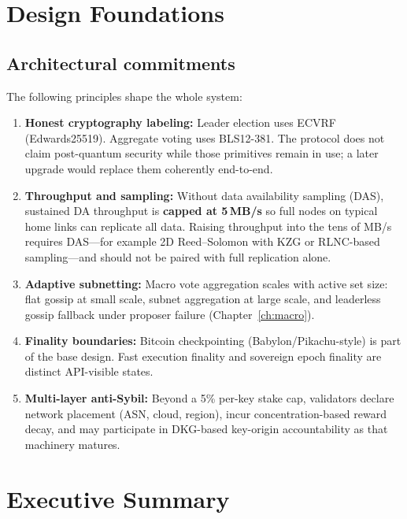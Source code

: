 \documentclass[11pt,a4paper,twoside]{report}
\theoremstyle{definition}
\begin{document}
\tableofcontents
\cleardoublepage

\chapter{Design Foundations}

\section{Architectural commitments}
The following principles shape the whole system:
\begin{enumerate}[leftmargin=*]
  \item \textbf{Honest cryptography labeling:} Leader election uses ECVRF (Edwards25519). Aggregate voting uses BLS12-381. The protocol does not claim post-quantum security while those primitives remain in use; a later upgrade would replace them coherently end-to-end.
  \item \textbf{Throughput and sampling:} Without data availability sampling (DAS), sustained DA throughput is \textbf{capped at 5\,MB/s} so full nodes on typical home links can replicate all data. Raising throughput into the tens of MB/s requires DAS---for example 2D Reed--Solomon with KZG or RLNC-based sampling---and should not be paired with full replication alone.
  \item \textbf{Adaptive subnetting:} Macro vote aggregation scales with active set size: flat gossip at small scale, subnet aggregation at large scale, and leaderless gossip fallback under proposer failure (Chapter~\ref{ch:macro}).
  \item \textbf{Finality boundaries:} Bitcoin checkpointing (Babylon/Pikachu-style) is part of the base design. Fast execution finality and sovereign epoch finality are distinct API-visible states.
  \item \textbf{Multi-layer anti-Sybil:} Beyond a 5\% per-key stake cap, validators declare network placement (ASN, cloud, region), incur concentration-based reward decay, and may participate in DKG-based key-origin accountability as that machinery matures.
\end{enumerate}

\chapter{Executive Summary}
\end{document}
